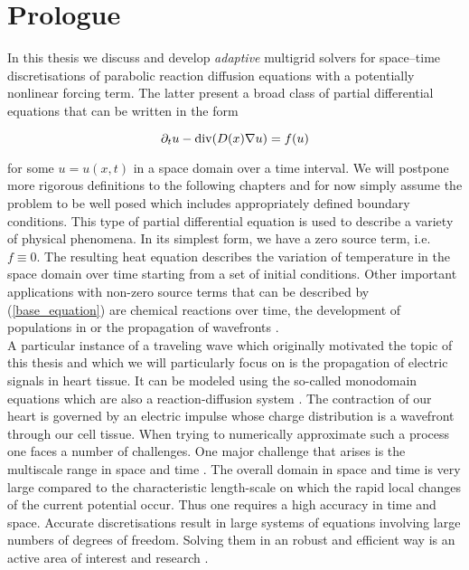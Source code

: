 \documentclass[../draft_1.tex]{subfiles}
\begin{document}
\chapter{Prologue}

In this thesis we  discuss and develop \textit{adaptive} multigrid solvers for space--time discretisations of parabolic reaction diffusion equations with a potentially nonlinear forcing term. The latter present a broad class of partial differential equations that can be written in the form
\begin{ceqn}
\begin{equation}
\label{base_equation}
\partial_t u - \mathop{}\!\mathrm{div} ( D(x) \nabla u) = f(u)
\end{equation}
\end{ceqn}
for some $u = u(x,t)$ in a space domain over a time interval. We will postpone more rigorous definitions to the following chapters and for now simply assume the problem to be well posed which includes appropriately defined boundary conditions. This type of partial differential equation is used to describe a variety of physical phenomena. In its simplest form, we have a zero source term, i.e. $f \equiv 0$. The resulting heat equation describes the variation of temperature in the space domain over time starting from a set of initial conditions. Other important applications with non-zero source terms that can be described by (\ref{base_equation}) are chemical reactions over time, the development of populations in \cite{cosner2008reaction} or the propagation of wavefronts \cite{zegeling2004adaptive}. 
\smallskip
\\
A particular instance of a traveling wave which originally motivated the topic of this thesis and which we will particularly focus on is the propagation of electric signals in heart tissue. It can be modeled using the so-called monodomain equations which are also a reaction-diffusion system \cite{franzone2014mathematical}. The contraction of our heart is governed by an electric impulse whose charge distribution is a wavefront through our cell tissue. When trying to numerically approximate such a process one faces a number of challenges. One major challenge that arises is the multiscale range in space and time \cite{colli2004parallel}. The overall domain in space and time is very large compared to the characteristic length-scale on which the rapid local changes of the current potential occur. Thus one requires a high accuracy in time and space. Accurate discretisations result in large systems of equations involving large numbers of degrees of freedom. Solving them in an robust and efficient way is an active area of interest and research \cite{hohmann2012numerical}. 
\end{document}
